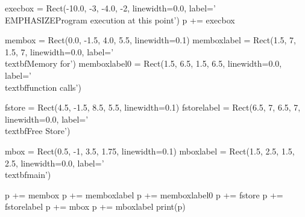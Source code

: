 \begin{python}
execbox = Rect(-10.0, -3, -4.0, -2, linewidth=0.0,
               label='\\EMPHASIZE{Program execution at this point}')
p += execbox

membox = Rect(0.0, -1.5, 4.0, 5.5, linewidth=0.1)
memboxlabel = Rect(1.5, 7, 1.5, 7, linewidth=0.0, label='\\textbf{Memory for}')
memboxlabel0 = Rect(1.5, 6.5, 1.5, 6.5, linewidth=0.0, label='\\textbf{function calls}')

fstore = Rect(4.5, -1.5, 8.5, 5.5, linewidth=0.1)
fstorelabel = Rect(6.5, 7, 6.5, 7, linewidth=0.0, label='\\textbf{Free Store}')

mbox = Rect(0.5, -1, 3.5, 1.75, linewidth=0.1)
mboxlabel = Rect(1.5, 2.5, 1.5, 2.5, linewidth=0.0, label='\\textbf{main}')

p += membox
p += memboxlabel
p += memboxlabel0
p += fstore
p += fstorelabel
p += mbox
p += mboxlabel
print(p)
\end{python}

